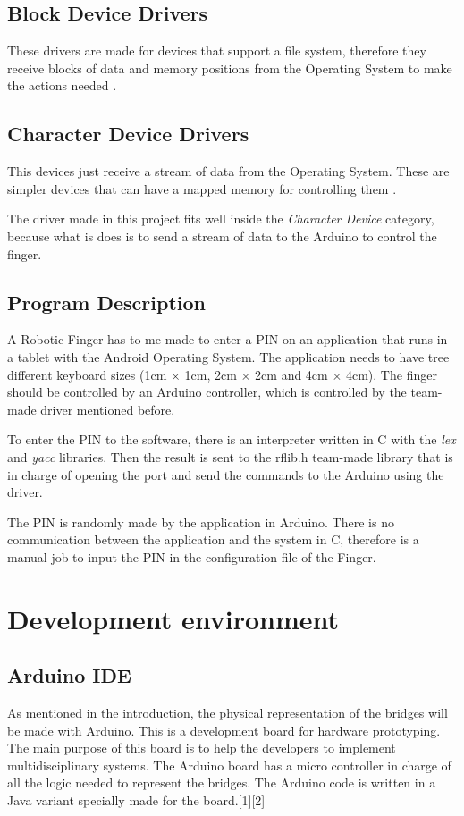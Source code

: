 \documentclass[12pt]{article}
\begin{document}
\subsection{Block Device Drivers}
These drivers are made for devices that support a file system, therefore they receive blocks of data and memory positions from the Operating System to make the actions needed \cite{oracle}.

\subsection{Character Device Drivers}
This devices just receive a stream of data from the Operating System. These are simpler devices that can have a mapped memory for controlling them \cite{oracle}.

The driver made in this project fits well inside the \textit{Character Device} category, because what is does is to send a stream of data to the Arduino to control the finger.

\subsection{Program Description}
A Robotic Finger has to me made to enter a PIN on an application that runs in a tablet with the Android Operating System. The application needs to have tree different keyboard sizes (1cm $\times$ 1cm, 2cm $\times$ 2cm and 4cm $\times$ 4cm). The finger should be controlled by an Arduino controller, which is controlled by the team-made driver mentioned before.

To enter the PIN to the software, there is an interpreter written in C with the \textit{lex} and \textit{yacc} libraries. Then the result is sent to the rflib.h team-made library that is in charge of opening the port and send the commands to the Arduino using the driver.

The PIN is randomly made by the application in Arduino. There is no communication between the application and the system in C, therefore is a manual job to input the PIN in the configuration file of the Finger.

\section{Development environment}
\subsection{Arduino IDE}
As mentioned in the introduction, the physical representation of the bridges will be made with Arduino. This is a development board for hardware prototyping. The main purpose of this board is to help the developers to implement multidisciplinary systems. The Arduino board has a micro controller in charge of all the logic needed to represent the bridges. The Arduino code is written in a Java variant specially made for the board.[1][2]
\end{document}
